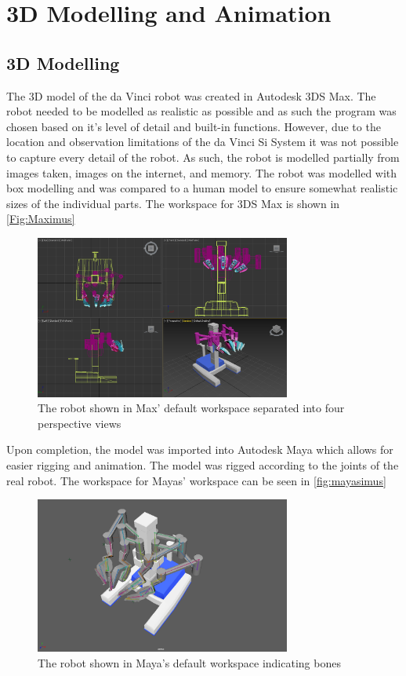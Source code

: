 \chapter{3D Modelling and Animation}

\section*{3D Modelling}
The 3D model of the da Vinci robot was created in Autodesk 3DS Max. The robot needed to be modelled as realistic as possible and as such the program was chosen based on it's level of detail and built-in functions. However, due to the location and observation limitations of the da Vinci Si System it was not possible to capture every detail of the robot. As such, the robot is modelled partially from images taken, images on the internet, and memory. The robot was modelled with box modelling and was compared to a human model to ensure somewhat realistic sizes of the individual parts. The workspace for 3DS Max is shown in \autoref{Fig:Maximus}

\begin{figure}[H]
	\centering
	\includegraphics[width=0.75\textwidth]{ModelAnim/Max}
	\caption{The robot shown in Max' default workspace separated into four perspective views}
	\label{Fig:Maximus}
\end{figure}

Upon completion, the model was imported into Autodesk Maya which allows for easier rigging and animation. The model was rigged according to the joints of the real robot. The workspace for Mayas' workspace can be seen in \autoref{fig:mayasimus}

\begin{figure}[H]
	\centering
	\includegraphics[width=0.75\textwidth]{ModelAnim/RobotMaya}
	\caption{The robot shown in Maya's default workspace indicating bones}
	\label{fig:mayasimus}
\end{figure}

